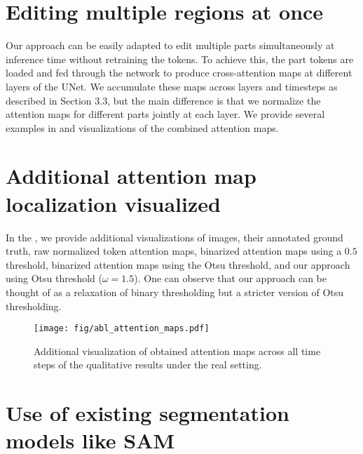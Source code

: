 
\section{Editing multiple regions at once}
\label{sec:multiple_edits_region}

Our approach can be easily adapted to edit multiple parts simultaneously at inference time without retraining the tokens.
To achieve this, the part tokens are loaded and fed through the network to produce cross-attention maps at different layers of the UNet.
We accumulate these maps across layers and timesteps as described in Section 3.3, but the main difference is that we normalize the attention maps for different parts jointly at each layer.
We provide several examples in  and visualizations of the combined attention maps.




\section{Additional attention map localization visualized}
\label{sec:map_localization}

In the , we provide additional visualizations of images, their annotated ground truth, raw normalized token attention maps, binarized attention maps using a $0.5$ threshold, binarized attention maps using the Otsu threshold, and our approach using Otsu threshold ($\omega=1.5$). One can observe that our approach can be thought of as a relaxation of binary thresholding but a stricter version of Otsu thresholding.

\begin{figure*}
    \centering
    \texttt{[image: fig/abl\_attention\_maps.pdf]}
    \caption{Additional visualization of obtained attention maps across all time steps of the qualitative results under the real setting.}
    \label{fig:abl_maps}
\end{figure*}


\section{Use of existing segmentation models like SAM}

